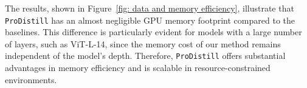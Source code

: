 The results, shown in Figure~\ref{fig: data and memory efficiency}, illustrate that \texttt{ProDistill} has an almost negligible GPU memory footprint compared to the baselines. This difference is particularly evident for models with a large number of layers, such as ViT-L-14, since the memory cost of our method remains independent of the model's depth. Therefore, \texttt{ProDistill} offers substantial advantages in memory efficiency and is scalable in resource-constrained environments.


